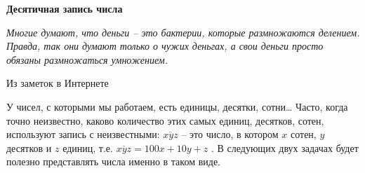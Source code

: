 \newpage

\begin{center}
	{\large\textbf{Десятичная запись числа}}
\end{center}

\epigraph{\textit{Многие думают, что деньги – это бактерии, которые размножаются делением. Правда, так они думают только о чужих деньгах, а свои деньги просто обязаны размножаться умножением.}}{Из заметок в Интернете}

У чисел, с которыми мы работаем, есть единицы, десятки, сотни… Часто, когда точно неизвестно, каково количество этих самых единиц, десятков, сотен, используют запись с неизвестными: $\overline{xyz}$ – это число, в котором $x$ сотен, $y$ десятков и $z$ единиц, т.е. $\overline{xyz} = 100x + 10y + z$ . В следующих двух  задачах будет полезно представлять числа именно в таком виде. 


